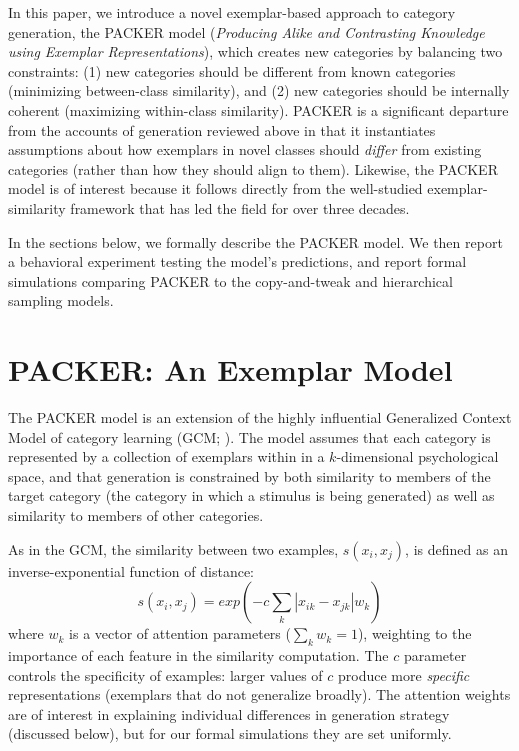 \documentclass[10pt,letterpaper]{article}
\begin{document}
In this paper, we introduce a novel exemplar-based approach to category generation, the PACKER model (\textit{Producing Alike and Contrasting Knowledge using Exemplar Representations}), which creates new categories by balancing two constraints: (1) new categories should be different from known categories (minimizing between-class similarity), and (2) new categories should be internally coherent (maximizing within-class similarity). PACKER is a significant departure from the accounts of generation reviewed above in that it instantiates assumptions about how exemplars in novel classes should \textit{differ} from existing categories (rather than how they should align to them). Likewise, the PACKER model is of interest because it follows directly from the well-studied exemplar-similarity framework that has led the field for over three decades.

In the sections below, we formally describe the PACKER model. We then report a behavioral experiment testing the model's predictions, and report formal simulations comparing PACKER to the copy-and-tweak and hierarchical sampling models.

\section{PACKER: An Exemplar Model}

The PACKER model is an extension of the highly influential Generalized Context Model of category learning (GCM; \citealp{nosofsky1984choice}). The model assumes that each category is represented by a collection of exemplars within in a $k$-dimensional psychological space, and that generation is constrained by both similarity to members of the target category (the category in which a stimulus is being generated) as well as similarity to members of other categories. 

As in the GCM, the similarity between two examples, $s(x_i, x_j)$, is defined as an inverse-exponential function of distance:
\begin{equation}
  s(x_i,x_j) = exp( -c \sum_{k}{|x_{ik} - x_{jk}|}w_k )
  \label{eq:similarity}
\end{equation}
where $w_k$ is a vector of attention parameters ($\sum_k{w_k} = 1$), weighting to the importance of each feature in the similarity computation. The $c$ parameter controls the specificity of examples: larger values of $c$ produce more \textit{specific} representations (exemplars that do not generalize broadly). The attention weights are of interest in explaining individual differences in generation strategy (discussed below), but for our formal simulations they are set uniformly.
\end{document}
